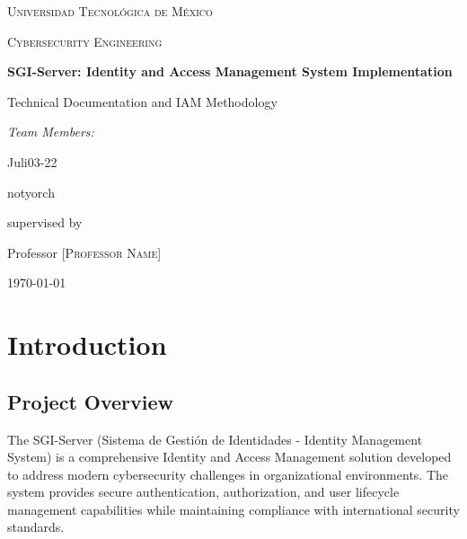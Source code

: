 \documentclass[12pt,a4paper]{article}
\begin{document}
\begin{titlepage}
\centering
{\scshape\LARGE Universidad Tecnológica de México \par}
\vspace{1cm}
{\scshape\Large Cybersecurity Engineering \par}
\vspace{1.5cm}
{\huge\bfseries SGI-Server: Identity and Access Management System Implementation \par}
\vspace{0.5cm}
{\Large Technical Documentation and IAM Methodology \par}
\vspace{2cm}
{\Large\itshape Team Members: \par}
\vspace{0.5cm}
{\large Juli03-22 \par}
{\large notyorch \par}
\vfill
supervised by\par
Professor \textsc{[Professor Name]}
\vfill
{\large \today\par}
\end{titlepage}

\tableofcontents
\newpage

\begin{abstract}
This technical document presents the implementation of a comprehensive Identity and Access Management (IAM) system called SGI-Server, designed to meet international security standards and best practices. The system implements a multi-layered authentication approach including traditional credentials, two-factor authentication (2FA), and WebAuthn/FIDO2 physical security keys. This document covers the complete IAM methodology implementation, access request and approval processes, provisioning and deprovisioning procedures, and compliance with international standards such as ISO 27001, NIST guidelines, and FIDO Alliance specifications.

\textbf{Keywords:} Identity Management, Access Control, WebAuthn, FIDO2, Multi-Factor Authentication, Security Standards
\end{abstract}

\section{Introduction}

\subsection{Project Overview}
The SGI-Server (Sistema de Gestión de Identidades - Identity Management System) is a comprehensive Identity and Access Management solution developed to address modern cybersecurity challenges in organizational environments. The system provides secure authentication, authorization, and user lifecycle management capabilities while maintaining compliance with international security standards.
\end{document}
